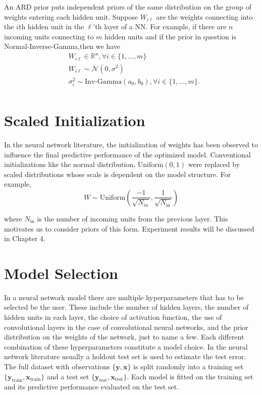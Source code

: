 \documentclass[12pt]{report}
\begin{document}
An ARD prior puts independent priors of the same distribution on the group of weights entering each hidden unit.
Suppose $W_{i\ell}$ are the weights connecting into the $i$th hidden unit in the $\ell$'th layer of a NN. For example, if there are $n$ incoming units connecting to $m$ hidden units and if the prior in question is Normal-Inverse-Gamma,then we have 
\begin{align*}
& W_{i\ell} \in \mathbb{R}^n , \forall i \in \{1,\dots,m\}\\ 
& W_{i\ell} \sim \mathcal{N}(0,\sigma^2) \\
& \sigma_i^2  \sim \text{Inv-Gamma}(a_0,b_0), \forall i \in \{1,\dots,m\} . \\
\end{align*}
\section{Scaled Initialization}
In the neural network literature, the initialization of weights has been observed to influence the final predictive performance of the optimized model. Conventional initializations like the normal distribution, $\text{Uniform}(0,1) $ were replaced by scaled distributions whose scale is dependent on the model structure. For example,
\[ W \sim \text{Uniform}(\frac{-1}{\sqrt{N_{in}}},\frac{1}{\sqrt{N_{\text{in}}}}) \]

where $N_\text{in}$ is the number of incoming units from the previous layer. This motivates us to consider priors of this form. Experiment results will be discussed in Chapter 4.
\section{Model Selection}
In a neural network model there are multiple hyperparameters that has to be selected be
the user. These include the number of hidden layers, the number of hidden
units in each layer, the choice of activation function, the use of
convolutional layers in the case of convolutional neural networks, and the prior
distribution on the weights of the network, just to name a few. Each different combination of these
hyperparameters constitute a model choice. In the neural network literature
usually a holdout test set is used to estimate the test error. The full dataset with observations
$\{\textbf{y},\textbf{x}\}$ is split randomly into a training set
$\{\textbf{y}_{\text{train}}, \textbf{x}_{\text{train}}\}$ and a test set $\{\textbf{y}_{\text{test}},
\textbf{x}_{\text{test}} \}$. Each model is fitted on the training set and its predictive
performance evaluated on the test set.
\end{document}

